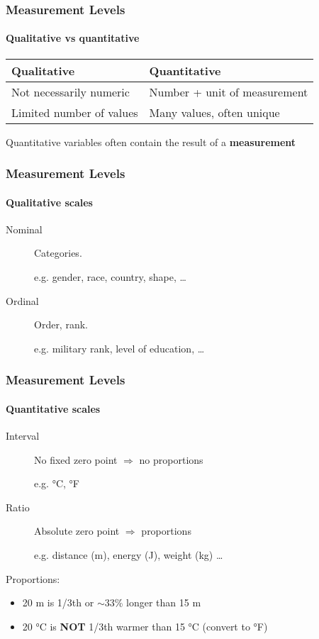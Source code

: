 \documentclass[aspectratio=169]{beamer}
\begin{document}
\begin{frame}
  \frametitle{Measurement Levels}
  \framesubtitle{Qualitative vs quantitative}
  
  \begin{center}
    \begin{tabular}{ll}
    	\textbf{Qualitative}       & \textbf{Quantitative}        \\
    	\hline
        Not necessarily numeric    & Number + unit of measurement \\
    	Limited number of values   & Many values, often unique
    \end{tabular}
  \end{center}

  \bigskip

  Quantitative variables often contain the result of a \textbf{measurement}
\end{frame}

\begin{frame}
  \frametitle{Measurement Levels}
  \framesubtitle{Qualitative scales}
  
  \begin{description}
    \item[Nominal] Categories.
    
      e.g. gender, race, country, shape, \ldots
      
    \item[Ordinal] Order, rank.
    
      e.g. military rank, level of education, \ldots
  \end{description}
  
\end{frame}

\begin{frame}
  \frametitle{Measurement Levels}
  \framesubtitle{Quantitative scales}
  
  \begin{description}
    \item[Interval] No fixed zero point $\Rightarrow$ no proportions
    
    e.g. °C, °F
    
    \item[Ratio] Absolute zero point $\Rightarrow$ proportions
    
    e.g. distance (m), energy (J), weight (kg) \ldots\\
  \end{description}

  \bigskip

  Proportions:
  
  \begin{itemize}
    \item 20 m is 1/3th or $\sim$33\% longer than 15 m
    \item 20 °C is \textbf{NOT} 1/3th warmer than 15 °C (convert to °F)

  \end{itemize}    
  
\end{frame}
\end{document}
